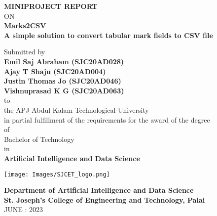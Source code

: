 \newpage %

\thispagestyle{empty}
\begin{center}
 
{\normalsize \bf MINIPROJECT REPORT}\\
ON\\
\vspace*{0.2 cm}
{\huge \bf Marks2CSV}\\
{\normalsize \bf A simple solution to convert tabular mark fields to CSV file}

   \vspace{0.5 cm}
   \large Submitted by\\
   { \bf Emil Saj Abraham (SJC20AD028)}\\
   { \bf Ajay T Shaju (SJC20AD004)}\\
   { \bf Justin Thomas Jo (SJC20AD046)}\\
   { \bf Vishnuprasad K G (SJC20AD063)}\\[-0.6mm]
  {\large to\\[-0.6mm] the APJ Abdul Kalam Technological University\\[-0.6mm] in partial fulfillment of the requirements for the award of the degree\\[-0.6mm] of\\[-0.6mm] Bachelor of Technology\\[-0.6mm] in\\[-0.6mm] {\bf Artificial Intelligence and Data Science}}
  
   \begin{center}
   \texttt{[image: Images/SJCET\_logo.png]}
   \end{center}
   \vspace*{-0.5cm}
  {\LARGE {\bf Department of Artificial Intelligence and Data Science}}\\
          [-3mm] {\large {\bf St. Joseph's College of Engineering and Technology, Palai}\\
           [1mm] JUNE : 2023}

\end{center}

\newpage

